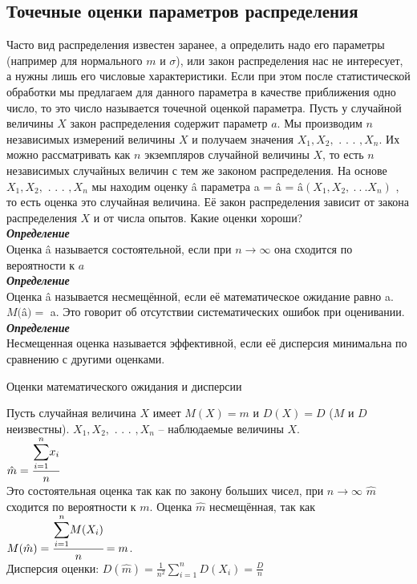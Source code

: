 \documentclass[russian, 12pt, fleqn,x11names]{article}
\begin{document}
\subsection{Точечные оценки параметров распределения}
\noindent
Часто вид распределения известен заранее, а определить надо его параметры (например для нормального $m$ и $\sigma$), или закон распределения нас не интересует, а нужны лишь его числовые характеристики.  Если при этом после статистической обработки мы предлагаем для данного параметра в качестве приближения одно число, то это число называется точечной оценкой параметра. Пусть у случайной величины $X$ закон распределения содержит параметр $a$. Мы производим $n$ независимых измерений величины $X$ и получаем значения $X_1, X_2, $ . . . $,X_n$. Их можно рассматривать как $n$ экземпляров случайной величины $X$, то есть $n$ независимых случайных величин с тем же законом распределения. На основе $X_1, X_2, $ . . . $,X_n$ мы находим оценку â параметра a = â  = â$(X_1, X_2, \ .\ .\ . X_n)$ , то есть оценка это случайная величина. Её закон распределения зависит от закона распределения $X$ и от числа опытов. Какие оценки хороши?\\
\textit{\textbf{Определение}} \\
Оценка â называется состоятельной, если при $n \rightarrow \infty$ она сходится по вероятности к $a$\\
\textit{\textbf{Определение}} \\
Оценка â называется несмещённой, если её математическое ожидание равно a. $M($â$) = $ a. Это говорит об отсутствии систематических ошибок при оценивании.\\
\textit{\textbf{Определение}} \\
Несмещенная оценка называется эффективной, если её дисперсия минимальна по сравнению с другими оценками.
\begin{center}
$\textbf{Оценки математического ожидания и дисперсии}$
\end{center}
Пусть случайная величина $X$ имеет $M(X) = m$ и $D(X) = D$ ($M$ и $D$ неизвестны). $X_1, X_2, $ . . . $,X_n$ -- наблюдаемые величины $X$.\\
 $\hat{m} =  \cfrac{\displaystyle{\sum \limits_{i = 1}^{ n }}x_i}{n} $ \normalsize\\
Это состоятельная оценка так как по закону больших чисел, при $n \rightarrow \infty$  $\hat{m}$ сходится по вероятности к $m$. Оценка $\hat{m}$ несмещённая, так как \\$M(\hat{m}) =\cfrac{  \displaystyle{\sum \limits_{i = 1}^{n}} M(X_i)  }{n} = m$.\\ Дисперсия оценки: $D(\hat{m}) = \frac{1}{n^2} \displaystyle{\sum \limits_{i = 1}^{n}}D(X_i)	  = \frac{D}{n}$\\
\end{document}
